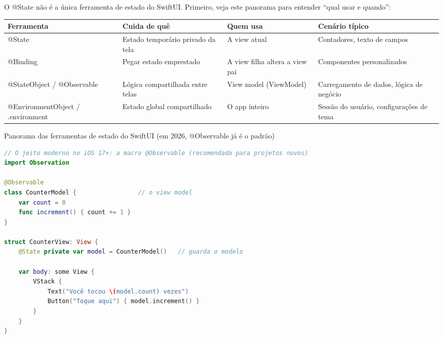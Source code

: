 


O @State não é a única ferramenta de estado do SwiftUI. Primeiro, veja este panorama para entender “qual usar e quando”:

\begin{center}
\begin{tabularx}{\linewidth}{|X|X|X|X|}
\hline
\textbf{Ferramenta} & \textbf{Cuida de quê} & \textbf{Quem usa} & \textbf{Cenário típico} \tabularnewline
\hline
@State & Estado temporário privado da tela & A view atual & Contadores, texto de campos \tabularnewline
@Binding & Pegar estado emprestado & A view filha altera a view pai & Componentes personalizados \tabularnewline
@StateObject / @Observable & Lógica compartilhada entre telas & View model (ViewModel) & Carregamento de dados, lógica de negócio \tabularnewline
@EnvironmentObject / .environment & Estado global compartilhado & O app inteiro & Sessão do usuário, configurações de tema \tabularnewline
\hline
\end{tabularx}
\end{center}

\begin{center}\small\color{gray}Panorama das ferramentas de estado do SwiftUI (em 2026, @Observable já é o padrão)\end{center}

\begin{lstlisting}[language=Swift]
// O jeito moderno no iOS 17+: a macro @Observable (recomendada para projetos novos)
import Observation

@Observable
class CounterModel {                 // o view model
    var count = 0
    func increment() { count += 1 }
}

struct CounterView: View {
    @State private var model = CounterModel()   // guarda o modelo

    var body: some View {
        VStack {
            Text("Você tocou \(model.count) vezes")
            Button("Toque aqui") { model.increment() }
        }
    }
}
\end{lstlisting}

